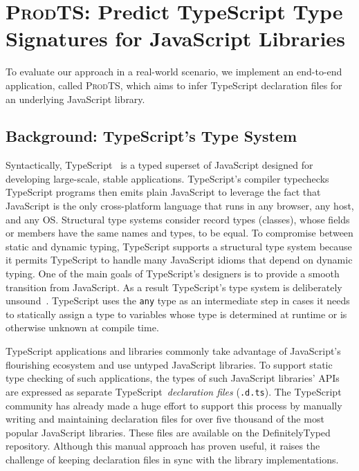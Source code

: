 \documentclass[sigplan,10pt,review,anonymous]{acmart} %
\newcommand{\prodts}{\textsc{ProdTS}\xspace}
\theoremstyle{plain}
\theoremstyle{remark}
\theoremstyle{definition}
\begin{document}
\section{\prodts: Predict TypeScript Type Signatures for JavaScript Libraries}
\label{sec:prodts}
To evaluate our approach in a real-world scenario, we
implement an end-to-end application, called \prodts, which aims
to infer TypeScript declaration files
for an underlying JavaScript library.

\subsection{Background: TypeScript's Type System}\label{ssec:intro-typescript}
Syntactically, TypeScript~\citep{typescript} is a typed superset of
JavaScript designed for developing large-scale, stable applications.
TypeScript's compiler typechecks TypeScript programs then emits plain JavaScript
to leverage the fact that JavaScript is the only cross-platform
language that runs in any browser, any host, and any OS.
Structural type systems consider record types (classes), whose fields or members have the same names and types, to be equal.
To compromise between static and dynamic typing, TypeScript supports a
structural type system because it permits TypeScript to handle many JavaScript idioms that depend on dynamic typing.
One of the main goals of TypeScript's designers is to
provide a smooth transition from JavaScript.
%
As a result TypeScript's type system is deliberately unsound~\citep{understandtypescript}.
TypeScript uses the \texttt{any} type as an intermediate
step in cases it needs to statically assign a type to variables
whose type is determined at runtime or is otherwise unknown at compile time.

TypeScript applications and libraries commonly take advantage of JavaScript's flourishing ecosystem
and use untyped JavaScript libraries.
To support static type checking of such applications,
the types of such JavaScript libraries' APIs are expressed
as separate TypeScript~\emph{declaration files} (\lstinline{.d.ts}).
The TypeScript community has already
made a huge effort to support this process by manually writing and maintaining
declaration files for over five thousand of the most popular JavaScript
libraries. These files are available on the DefinitelyTyped
\citep{definitelytyped} repository.
Although this manual approach has proven
useful, it raises the challenge of keeping declaration files
in sync with the library implementations.
\end{document}
